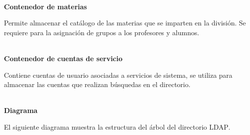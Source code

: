 \textbf{\\ Contenedor de materias \\}

Permite almacenar el cat\'{a}logo de las materias que se imparten en la divisi\'{o}n. Se requiere para la asignaci\'{o}n de grupos a los profesores y alumnos.

\textbf{\\ Contenedor de cuentas de servicio \\}

Contiene cuentas de usuario asociadas a servicios de sistema, se utiliza para almacenar las cuentas que realizan b\'{u}squedas en el directorio.

\textbf{\\ Diagrama \\}

El siguiente diagrama muestra la estructura del \'{a}rbol del directorio \textsc{LDAP}.

